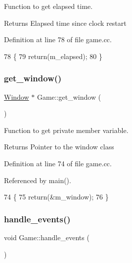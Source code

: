 Function to get elapsed time. 

\begin{DoxyReturn}{Returns}
Elapsed time since clock restart 
\end{DoxyReturn}


Definition at line 78 of file game.\+cc.


\begin{DoxyCode}
78                          \{
79     \textcolor{keywordflow}{return}(m\_elapsed);
80 \}
\end{DoxyCode}
\mbox{\label{class_game_ada27344ddafc8489f4d6ab5ec6cd9a8e}} 
\subsubsection{\texorpdfstring{get\+\_\+window()}{get\_window()}}
{\footnotesize\ttfamily \hyperlink{class_window}{Window} $\ast$ Game\+::get\+\_\+window (\begin{DoxyParamCaption}{ }\end{DoxyParamCaption})}



Function to get private member variable. 

\begin{DoxyReturn}{Returns}
Pointer to the window class 
\end{DoxyReturn}


Definition at line 74 of file game.\+cc.



Referenced by main().


\begin{DoxyCode}
74                          \{
75     \textcolor{keywordflow}{return}(&m\_window);
76 \}
\end{DoxyCode}
\mbox{\label{class_game_a698430daa658033e7746e3a161a859a9}} 
\subsubsection{\texorpdfstring{handle\+\_\+events()}{handle\_events()}}
{\footnotesize\ttfamily void Game\+::handle\+\_\+events (\begin{DoxyParamCaption}{ }\end{DoxyParamCaption})}



